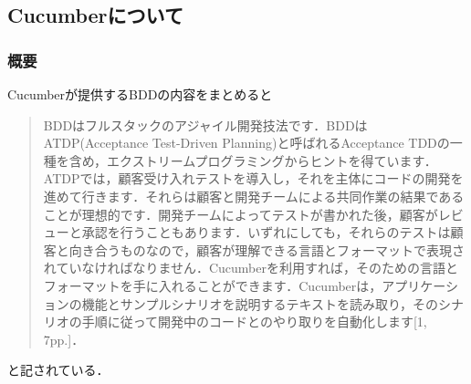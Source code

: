 
\subsection{Cucumberについて}
\subsubsection{概要}
Cucumberが提供するBDDの内容をまとめると

\begin{quotation}
BDDはフルスタックのアジャイル開発技法です．BDDはATDP(Acceptance Test-Driven Planning)と呼ばれるAcceptance TDDの一種を含め，エクストリームプログラミングからヒントを得ています．ATDPでは，顧客受け入れテストを導入し，それを主体にコードの開発を進めて行きます．それらは顧客と開発チームによる共同作業の結果であることが理想的です．開発チームによってテストが書かれた後，顧客がレビューと承認を行うこともあります．いずれにしても，それらのテストは顧客と向き合うものなので，顧客が理解できる言語とフォーマットで表現されていなければなりません．Cucumberを利用すれば，そのための言語とフォーマットを手に入れることができます．Cucumberは，アプリケーションの機能とサンプルシナリオを説明するテキストを読み取り，そのシナリオの手順に従って開発中のコードとのやり取りを自動化します[1, 7pp.]．

\end{quotation}
と記されている．

